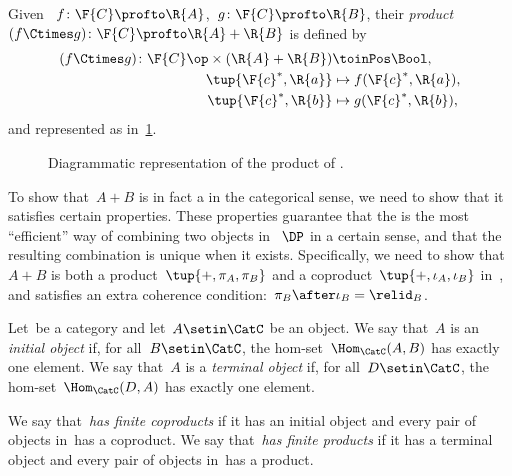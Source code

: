 \begin{definition}
    \label{def:product-dp}
    Given ~$f\colon \F{C} \profto \R{A}$,~$g \colon \F{C} \profto \R{B}$, their \emph{product}~$(f \Ctimes g)\colon \F{C} \profto \R{A} + \R{B}$ is defined by
    \begin{equation}
        \begin{aligned}
            (f \Ctimes g)
            \colon \F{C}\op  \times (\R{A} + \R{B}) & \toinPos \Bool, \\
            \tup{\F{c}^*, \R{a}}                    & \mapsto f(\F{c}^*, \R{a}), \\
            \tup{\F{c}^*, \R{b}}                    & \mapsto g(\F{c}^*, \R{b}),
        \end{aligned}
    \end{equation}
    and represented as in~\cref{fig:productdp}.
\end{definition}

\begin{figure}[h!]
    \centering
    \caption{Diagrammatic representation of the product of . }
    \label{fig:productdp}
\end{figure}

To show that~$A + B$ is in fact a  in the categorical sense, we need to show that it satisfies certain properties.
These properties guarantee that the  is the most ``efficient'' way of combining two objects in~$~\DP$ in a certain sense, and that the resulting combination is unique when it exists.
Specifically, we need to show that~$A + B$ is both a product~$\tup{+, \pi_A, \pi_B}$ and a coproduct~$\tup{+, \iota_A, \iota_B}$ in~\DP, and satisfies an extra coherence condition:~$\pi_B \after \iota_B = \relid_B$.

\begin{ctdefinition}
    \label{def:initial-terminal-object}
    Let~\CatC be a category and let~$A \setin \CatC$ be an object.
    We say that~$A$ is an \emph{initial object} if, for all~$B \setin\CatC$, the hom-set~$\Hom_\CatC(A,B)$ has exactly one element.
    We say that~$A$ is a \emph{terminal object} if, for all~$D\setin\CatC$, the hom-set~$\Hom_\CatC(D,A)$ has exactly one element.
\end{ctdefinition}

\begin{ctdefinition}
    \label{def:finite-products}
    We say that~\CatC \emph{has finite coproducts} if it has an initial object and every pair of objects in~\CatC has a coproduct.
    We say that~\CatC \emph{has finite products} if it has a terminal object and every pair of objects in~\CatC has a product.
\end{ctdefinition}


